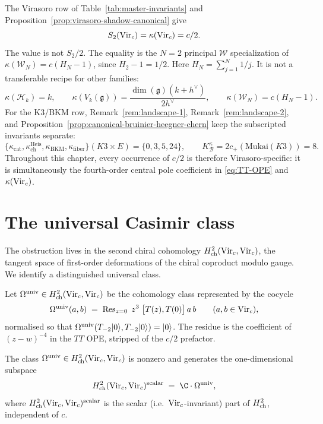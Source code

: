 \begin{remark}[On $\kappa(\Virc) = c/2$]
\label{rem:kappa-vir-is-c-over-2}
The Virasoro row of Table~\ref{tab:master-invariants} and
Proposition~\ref{prop:virasoro-shadow-canonical} give
\[
S_{2}(\mathrm{Vir}_{c})=\kappa(\mathrm{Vir}_{c})=c/2.
\]
The value is not $S_{2}/2$. The equality is the
$N=2$ principal $\mathcal W$ specialization of
$\kappa(\mathcal W_N)=c(H_N-1)$, since $H_2-1=1/2$.
Here $H_N=\sum_{j=1}^{N}1/j$.
It is not a transferable recipe for other families:
\[
\kappa(\mathcal H_k)=k,\qquad
\kappa(V_k(\mathfrak g))
=\frac{\dim(\mathfrak g)(k+h^\vee)}{2h^\vee},\qquad
\kappa(\mathcal W_N)=c(H_N-1).
\]
For the K3/BKM row, Remark~\ref{rem:landscape-1},
Remark~\ref{rem:landscape-2}, and
Proposition~\ref{prop:canonical-bruinier-heegner-chern} keep the
subscripted invariants separate:
\[
\{\kappa_{\mathrm{cat}},
\kappa_{\mathrm{ch}}^{\mathrm{Heis}},
\kappa_{\mathrm{BKM}},
\kappa_{\mathrm{fiber}}\}(K3\times E)
=\{0,3,5,24\},
\qquad
K^\kappa_{\mathcal B}=2c_+(\mathrm{Mukai}(K3))=8.
\]
Throughout this chapter, every occurrence of $c/2$ is therefore
Virasoro-specific: it is simultaneously the fourth-order central pole
coefficient in \eqref{eq:TT-OPE} and $\kappa(\mathrm{Vir}_{c})$.
\end{remark}

\section{The universal Casimir class}
\label{sec:universal-casimir}

The obstruction lives in the second chiral cohomology
$H^{2}_{\mathrm{ch}}(\mathrm{Vir}_{c}, \mathrm{Vir}_{c})$, the tangent space of first-order
deformations of the chiral coproduct modulo gauge. We identify a
distinguished universal class.

\begin{definition}
\label{def:universal-casimir}
Let $\Omega^{\mathrm{univ}} \in H^{2}_{\mathrm{ch}}(\mathrm{Vir}_{c}, \mathrm{Vir}_{c})$ be the cohomology class
represented by the cocycle
\[
\Omega^{\mathrm{univ}}(a, b) \;=\;
\operatorname{Res}_{z = 0}\; z^{3}\;\bigl[T(z), T(0)\bigr]\, a\, b
\qquad (a, b \in \mathrm{Vir}_{c}),
\]
normalised so that $\Omega^{\mathrm{univ}}(T_{-2}|0\rangle, T_{-2}|0\rangle)
= |0\rangle$. The residue is the coefficient of $(z - w)^{-4}$ in the
$TT$ OPE, stripped of the $c/2$ prefactor.
\end{definition}

\begin{lemma}
\label{lem:casimir-nonvanishing}
\ClaimStatusProvedHere
The class $\Omega^{\mathrm{univ}} \in H^{2}_{\mathrm{ch}}(\mathrm{Vir}_{c}, \mathrm{Vir}_{c})$ is nonzero and generates
the one-dimensional subspace
\[
\Hchtwo(\Virc, \Virc)^{\mathrm{scalar}}
\;=\;
\C \cdot \Cas,
\]
where $H^{2}_{\mathrm{ch}}(\mathrm{Vir}_{c}, \mathrm{Vir}_{c})^{\mathrm{scalar}}$ is the scalar
(i.e.\ $\mathrm{Vir}_{c}$-invariant) part of $H^{2}_{\mathrm{ch}}$, independent of $c$.
\end{lemma}

